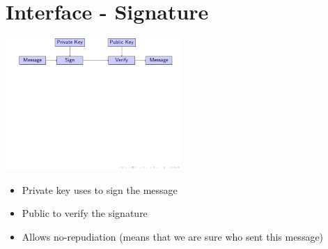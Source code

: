 \section{Interface - Signature}

\begin{frame}

\includegraphics[trim=0.5cm 4cm 14cm 0cm, height=5cm]{figures/signature.pdf}

\begin{itemize}
  \item Private key uses to sign the message
  \item Public to verify the signature
  \item Allows no-repudiation (means that we are sure who sent this message)
\end{itemize}



\end{frame}
